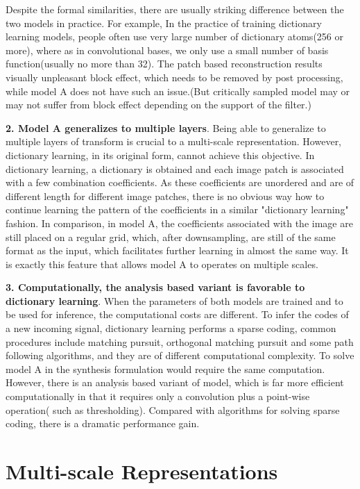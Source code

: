 \documentclass[a4paper]{article}
\begin{document}
Despite the formal similarities, there are usually striking difference between the two models in practice. For example, In the practice of training dictionary learning models, people often use very large number of dictionary atoms(256 or more), where as in convolutional bases, we only use a small number of basis function(usually no more than 32). The patch based reconstruction results visually unpleasant block effect, which needs to be removed by post processing, while model A does not have such an issue.(But critically sampled model may or may not suffer from block effect depending on the support of the filter.)

\textbf{2. Model A generalizes to multiple layers}. Being able to generalize to multiple layers of transform is crucial to a multi-scale representation. However, dictionary learning, in its original form, cannot achieve this objective. In dictionary learning, a dictionary is obtained and each image patch is associated with a few combination coefficients. As these coefficients are unordered and are of different length for different image patches, there is no obvious way how to continue learning the pattern of the coefficients in a similar "dictionary learning" fashion. In comparison, in model A, the coefficients associated with the image are still placed on a regular grid, which, after downsampling, are still of the same format as the input, which facilitates further learning in almost the same way. It is exactly this feature that allows model A to operates on multiple scales. 

\textbf{3. Computationally, the analysis based variant is favorable to dictionary learning}. When the parameters of both models are trained and to be used for inference, the computational costs are different. To infer the codes of a new incoming signal, dictionary learning performs a sparse coding, common procedures include matching pursuit, orthogonal matching pursuit and some path following algorithms, and they are of  different computational complexity. To solve model A in the synthesis formulation would require the same computation. However, there is an analysis based variant of model, which is far more efficient computationally in that it requires only a convolution plus a point-wise operation( such as thresholding). Compared with algorithms for solving sparse coding, there is a dramatic performance gain.

\section{Multi-scale Representations}
\end{document}

